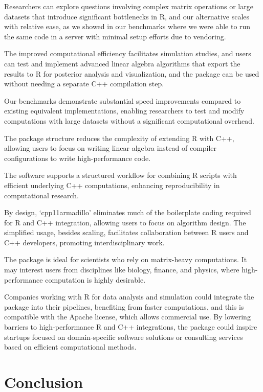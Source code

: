 \documentclass[preprint,12pt, a4paper]{elsarticle}
\begin{document}
Researchers can explore questions involving complex matrix operations or
large datasets that introduce significant bottlenecks in R, and our
alternative scales with relative ease, as we showed in our benchmarks
where we were able to run the same code in a server with minimal setup
efforts due to vendoring.

The improved computational efficiency facilitates simulation studies,
and users can test and implement advanced linear algebra algorithms that
export the results to R for posterior analysis and visualization, and
the package can be used without needing a separate C++ compilation step.

Our benchmarks demonstrate substantial speed improvements compared to
existing equivalent implementations, enabling researchers to test and
modify computations with large datasets without a significant
computational overhead.

The package structure reduces the complexity of extending R with C++,
allowing users to focus on writing linear algebra instead of compiler
configurations to write high-performance code.

The software supports a structured workflow for combining R scripts with
efficient underlying C++ computations, enhancing reproducibility in
computational research.

By design, `cpp11armadillo' eliminates much of the boilerplate coding
required for R and C++ integration, allowing users to focus on algorithm
design. The simplified usage, besides scaling, facilitates collaboration
between R users and C++ developers, promoting interdisciplinary work.

The package is ideal for scientists who rely on matrix-heavy
computations. It may interest users from disciplines like biology,
finance, and physics, where high-performance computation is highly
desirable.

Companies working with R for data analysis and simulation could
integrate the package into their pipelines, benefiting from faster
computations, and this is compatible with the Apache license, which
allows commercial use. By lowering barriers to high-performance R and
C++ integrations, the package could inspire startups focused on
domain-specific software solutions or consulting services based on
efficient computational methods.

\section{Conclusion}\label{conclusion}
\end{document}
